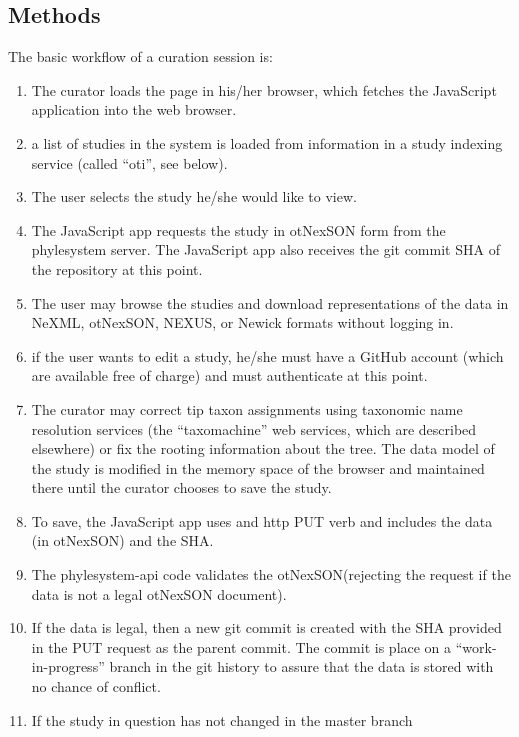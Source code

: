 \documentclass{bioinfo}
\newcommand{\ps}{phylesystem\xspace}
\newcommand{\nexson}{otNexSON\xspace}
\newcommand{\js}{JavaScript\xspace}
\begin{document}
\begin{methods}
\section{Methods}
The basic workflow of a curation session is:
\begin{enumerate}
    \item \label{loadAppStep} The curator loads the page in his/her browser, which fetches the \js application into the web browser.
    \item \label{otiListStep} a list of studies in the system is loaded from information in a study indexing service (called ``oti'', see below).
    \item The user selects the study he/she would like to view.
    \item \label{getStudyStep} The \js app requests the study in \nexson form from the \ps server.
        The \js app also receives the git commit SHA of the 
        repository at this point.
    \item \label{browseStep} The user may browse the studies and download representations of the data in NeXML, \nexson, NEXUS\cite{NEXUS}, or Newick formats without logging in.
    \item \label{authStep} if the user wants to edit a study, he/she must have a GitHub account (which are available free of charge) and must authenticate at this point.
    \item \label{userEditStep} The curator may correct tip taxon assignments using taxonomic name resolution services (the ``taxomachine'' web services, which are described
        elsewhere) or fix the rooting information about the tree. The data model of the study is modified in the memory space of the 
        browser and maintained there until the curator chooses to save the study.
    \item \label{putStep} To save, the \js app uses and http PUT verb and includes the data (in \nexson) and the SHA.
    \item \label{validateStep} The \ps-api code validates the \nexson (rejecting the request if the data is not a legal \nexson document).
    \item \label{gitSaveStep} If the data is legal, then a new git commit is created with the SHA
        provided in the PUT request as the parent commit. The commit is place on a 
        ``work-in-progress'' branch in the git history to assure that the data is stored with 
        no chance of conflict.
    \item \label{gitMergeStep} If the study in question has not changed in the master branch 

\end{enumerate}
\end{methods}
\end{document}
